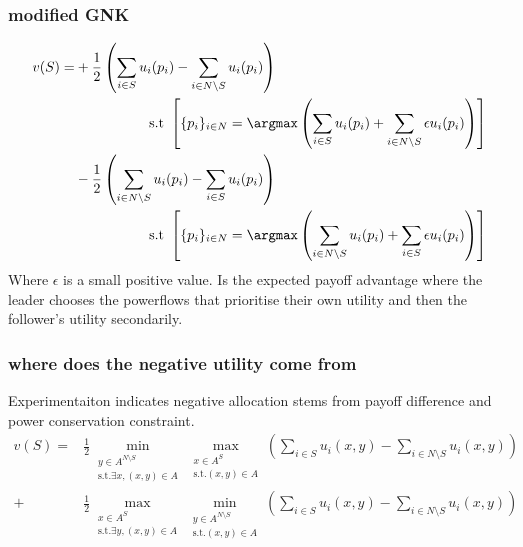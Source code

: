 \begin{frame}
\frametitle{modified GNK}
\begin{align*}
\label{knvalue22}
v(S) = &+ \frac{1}{2}\left(\sum_{i\in S} u_i(p_i) - \sum_{i\in N\setminus S}u_i(p_i)\right)\nonumber\\
&\quad\quad\quad\quad\quad~\text{s.t}~ \left[\{p_i\}_{i\in N}=\argmax \left(\sum_{i\in S} u_i(p_i) + \sum_{i\in N\setminus S}\epsilon u_i(p_i)\right)\right]\nonumber\\
&- \frac{1}{2}\left(\sum_{i\in N\setminus S}u_i(p_i) - \sum_{i\in S} u_i(p_i)\right)\nonumber\\
&\quad\quad\quad\quad\quad~\text{s.t}~ \left[\{p_i\}_{i\in N}=\argmax \left(\sum_{i\in N\setminus S}u_i(p_i) + \sum_{i\in S} \epsilon u_i(p_i) \right)\right]
\end{align*}
Where $\epsilon$ is a small positive value.
Is the expected payoff advantage where the leader chooses the powerflows that prioritise their own utility and then the follower's utility secondarily.
\end{frame}


\begin{frame}

\end{frame}


\begin{frame}

\end{frame}
%
\begin{frame}

\end{frame}
\begin{frame}

\end{frame}


\begin{frame}
\frametitle{where does the negative utility come from}
Experimentaiton indicates negative allocation stems from payoff difference and power conservation constraint.
\begin{align}
v(S) = &
\frac{1}{2}\min_{\substack{y\in A^{N\setminus S} \\ \text{s.t.}\exists x,(x,y)\in A}} 
\max_{\substack{x\in A^S \\ \text{s.t.}(x,y)\in A}}
	\left(\sum_{i\in S} u_i(x,y) - \sum_{i\in N\setminus S}u_i(x,y)\right)\nonumber\\
+&
\frac{1}{2}\max_{\substack{x\in A^S \\ \text{s.t.}\exists y,(x,y)\in A}}
\min_{\substack{y\in A^{N\setminus S} \\ \text{s.t.}(x,y)\in A}}
	\left(\sum_{i\in S} u_i(x,y) - \sum_{i\in N\setminus S} u_i(x,y) \right)
\end{align}
\end{frame}



